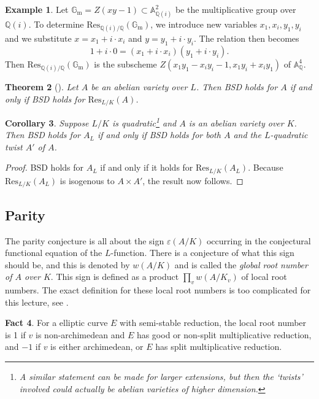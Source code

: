 \documentclass[12pt]{article}
\newtheorem{theorem}{Theorem}[section]
\newtheorem{corollary}[theorem]{Corollary}
\theoremstyle{definition}
\newtheorem{fact}[theorem]{Fact}
\newtheorem{example}[theorem]{Example}
\numberwithin{equation}{subsection}
\newcommand{\Q}{\ensuremath{\mathbb{Q}}}
\begin{document}
\begin{example}
Let $\mathbb{G}_\mathrm{m} = Z(xy - 1) \subset \mathbb{A}^2_{\Q(i)}$ be the multiplicative group over $\Q(i)$.
To determine $\mathrm{Res}_{\Q(i)/\Q}(\mathbb{G}_\mathrm{m})$, we introduce new variables $x_1, x_i, y_1, y_i$ and we substitute $x = x_1 + i \cdot x_i$ and $y = y_1 + i \cdot y_i$.
The relation then becomes
$$1 + i \cdot 0 = (x_1 + i \cdot x_i)(y_1 + i \cdot y_i).$$
Then $\mathrm{Res}_{\Q(i)/\Q}(\mathbb{G}_\mathrm{m})$ is the subscheme $Z(x_1y_1 - x_iy_i - 1, x_1y_i + x_iy_1)$ of $\mathbb{A}^4_{\Q}$.
\end{example}

\begin{theorem}[\textrm{\cite[Thm.~1]{Milne72}}]
Let $A$ be an abelian variety over $L$. Then BSD holds for $A$ if and only if BSD holds for $\mathrm{Res}_{L/K}(A)$.
\end{theorem}

\begin{corollary}
Suppose $L/K$ is quadratic\footnote{A similar statement can be made for larger extensions, but then the `twists' involved could actually be abelian varieties of higher dimension.} and $A$ is an abelian variety over $K$. Then BSD holds for $A_L$ if and only if BSD holds for both $A$ and the $L$-quadratic twist $A'$ of $A$.
\end{corollary}

\begin{proof}
BSD holds for $A_L$ if and only if it holds for $\mathrm{Res}_{L/K}(A_L)$.
Because $\mathrm{Res}_{L/K}(A_L)$ is isogenous to $A \times A'$, the result now follows.
\end{proof}

\subsection{Parity}

The parity conjecture is all about the sign $\varepsilon(A/K)$ occurring in the conjectural functional equation of the $L$-function.
There is a conjecture of what this sign should be, and this is denoted by $w(A/K)$ and is called the {\em global root number of $A$ over $K$}.
This sign is defined as a product $\prod_v w(A/K_v)$ of local root numbers.
The exact definition for these local root numbers is too complicated for this lecture, see \cite{DokchitserParity}.

\begin{fact}
For a elliptic curve $E$ with semi-stable reduction, the local root number is 1 if $v$ is non-archimedean and $E$ has good or non-split multiplicative reduction, and $-1$ if $v$ is either archimedean, or $E$ has split multiplicative reduction.
\end{fact}
\end{document}
